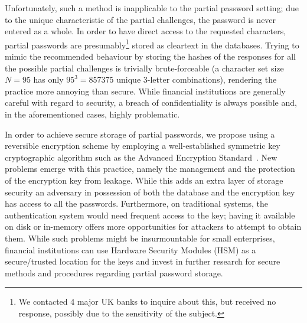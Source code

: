      Unfortunately, such a method is inapplicable to the partial password setting; due to the unique characteristic of the partial challenges, the password is never entered as a whole. In order to have direct access to the requested characters, partial passwords are presumably\footnote{We contacted 4 major UK banks to inquire about this, but received no response, possibly due to the sensitivity of the subject.} stored as cleartext in the databases. Trying to mimic the recommended behaviour by storing the hashes of the responses for all the possible partial challenges is trivially brute-forceable (a character set size $N=95$ has only $95^3 = 857375$ unique 3-letter combinations), rendering the practice more annoying than secure. While financial institutions are generally careful with regard to security, a breach of confidentiality is always possible and, in the aforementioned cases, highly problematic.

      In order to achieve secure storage of partial passwords, we propose using a reversible encryption scheme by employing a well-established symmetric key cryptographic algorithm such as the Advanced Encryption Standard~\cite{fips_AES}. New problems emerge with this practice, namely the management and the protection of the encryption key from leakage. While this adds an extra layer of storage security an adversary in possession of both the database and the encryption key has access to all the passwords. Furthermore, on traditional systems, the authentication system would need frequent access to the key; having it available on disk or in-memory offers more opportunities for attackers to attempt to obtain them. While such problems might be insurmountable for small enterprises, financial institutions can use Hardware Security Modules (HSM) as a secure/trusted location for the keys and invest in further research for secure methods and procedures regarding partial password storage.